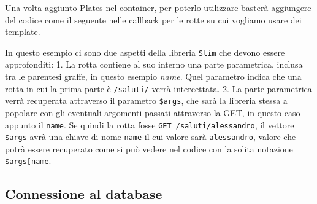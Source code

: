 Una volta aggiunto Plates nel container, per poterlo utilizzare basterà
aggiungere del codice come il seguente nelle callback per le rotte su
cui vogliamo usare dei template.

\begin{Shaded}
\begin{Highlighting}[]
\OtherTok{,} \NormalTok{ (}\OtherTok{,} \OtherTok{,} \NormalTok{) \{}
     \OperatorTok{=} \NormalTok{)}\OtherTok{;}
    \OtherTok{,}
\NormalTok{            [}
                \NormalTok{ =\textgreater{} }\NormalTok{[}\NormalTok{]}
\NormalTok{            ]}
\NormalTok{        )}
\NormalTok{    )}\OtherTok{;}
     \OtherTok{;}
\NormalTok{\})}\OtherTok{;}
\end{Highlighting}
\end{Shaded}

In questo esempio ci sono due aspetti della libreria \texttt{Slim} che
devono essere approfonditi: 1. La rotta contiene al suo interno una
parte parametrica, inclusa tra le parentesi graffe, in questo esempio
\emph{name}. Quel parametro indica che una rotta in cui la prima parte è
\texttt{/saluti/} verrà intercettata. 2. La parte parametrica verrà
recuperata attraverso il parametro \texttt{\$args}, che sarà la libreria
stessa a popolare con gli eventuali argomenti passati attraverso la GET,
in questo caso appunto il \texttt{name}. Se quindi la rotta fosse
\texttt{GET\ /saluti/alessandro}, il vettore \texttt{\$args} avrà una
chiave di nome \texttt{name} il cui valore sarà \texttt{alessandro},
valore che potrà essere recuperato come si può vedere nel codice con la
solita notazione
\texttt{\$args{[}\textquotesingle{}name\textquotesingle{}{]}}.

\hypertarget{connessione-al-database}{%
\subsection{Connessione al database}\label{connessione-al-database}}

